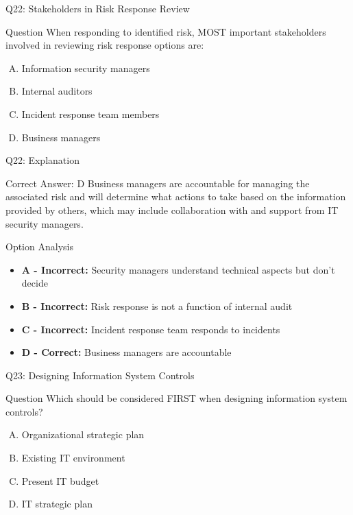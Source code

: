\documentclass{beamer}
\begin{document}
	\begin{frame}{Q22: Stakeholders in Risk Response Review}
		\begin{block}{Question}
			When responding to identified risk, MOST important stakeholders involved in reviewing risk response options are:
		\end{block}
		\begin{enumerate}[(A)]
			\item Information security managers
			\item Internal auditors
			\item Incident response team members
			\item Business managers
		\end{enumerate}
	\end{frame}
	
	\begin{frame}{Q22: Explanation}
		\begin{block}{Correct Answer: D}
			Business managers are accountable for managing the associated risk and will determine what actions to take based on the information provided by others, which may include collaboration with and support from IT security managers.
		\end{block}
		\begin{block}{Option Analysis}
			\begin{itemize}
				\item \textbf{A - Incorrect:} Security managers understand technical aspects but don't decide
				\item \textbf{B - Incorrect:} Risk response is not a function of internal audit
				\item \textbf{C - Incorrect:} Incident response team responds to incidents
				\item \textbf{D - Correct:} Business managers are accountable
			\end{itemize}
		\end{block}
	\end{frame}
	
	\begin{frame}{Q23: Designing Information System Controls}
		\begin{block}{Question}
			Which should be considered FIRST when designing information system controls?
		\end{block}
		\begin{enumerate}[(A)]
			\item Organizational strategic plan
			\item Existing IT environment
			\item Present IT budget
			\item IT strategic plan
		\end{enumerate}
	\end{frame}
	
\end{document}
